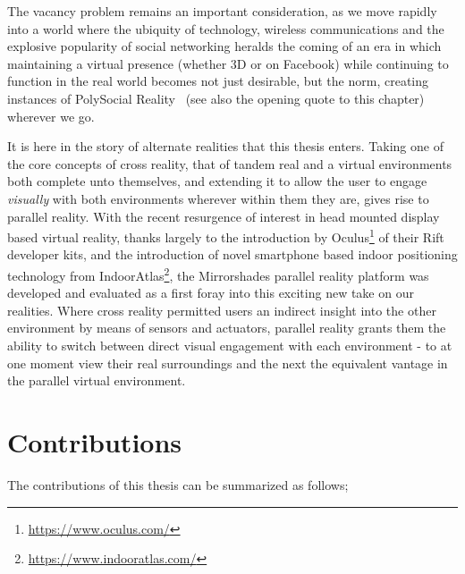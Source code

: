 The vacancy problem remains an important consideration, as we move rapidly into a world where the ubiquity of technology, wireless communications and the explosive popularity of social networking heralds the coming of an era in which maintaining a virtual presence (whether 3D or on Facebook) while continuing to function in the real world becomes not just desirable, but the norm, creating instances of PolySocial Reality~\cite{Applin2012} (see also the opening quote to this chapter) wherever we go.

It is here in the story of alternate realities that this thesis enters. Taking one of the core concepts of cross reality, that of tandem real and a virtual environments both complete unto themselves, and extending it to allow the user to engage \textit{visually} with both environments wherever within them they are, gives rise to parallel reality. With the recent resurgence of interest in head mounted display based virtual reality, thanks largely to the introduction by Oculus\footnote{\url{https://www.oculus.com/}} of their Rift developer kits, and the introduction of novel smartphone based indoor positioning technology from IndoorAtlas\footnote{\url{https://www.indooratlas.com/}}, the Mirrorshades parallel reality platform was developed and evaluated as a first foray into this exciting new take on our realities. Where cross reality permitted users an indirect insight into the other environment by means of sensors and actuators, parallel reality grants them the ability to switch between direct visual engagement with each environment - to at one moment view their real surroundings and the next the equivalent vantage in the parallel virtual environment.


\section{Contributions}
\label{intro-contributions}
The contributions of this thesis can be summarized as follows;

